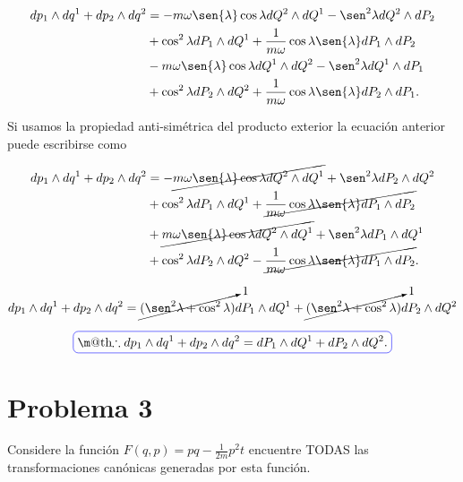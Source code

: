\documentclass[a4paper,10pt]{article}
\makeatletter
\numberwithin{equation}{section}
\newcommand*{\boxcolor}{blue}
\renewcommand{\boxed}[1]{\textcolor{\boxcolor}{%
\tikz[baseline={([yshift=-1ex]current bounding box.center)}] \node [rectangle, minimum width=1ex,rounded corners,draw] {\normalcolor\m@th$\displaystyle#1$};}}
\makeatother
\begin{document}
\begin{align*}
 dp_1 \wedge dq^1 + dp_2 \wedge dq^2 &= - m\omega\sen{\lambda}\cos{\lambda} dQ^2 \wedge dQ^1
  - \sen^2{\lambda}dQ^2 \wedge dP_2 \\ 
  &+ \cos^2{\lambda}dP_1 \wedge dQ^1 + \frac{1}{m\omega}\cos{\lambda}\sen{\lambda} dP_1 \wedge dP_2 \\ 
  &- m\omega\sen{\lambda}\cos{\lambda} dQ^1 \wedge dQ^2
  - \sen^2{\lambda}dQ^1 \wedge dP_1 \\
  &+ \cos^2{\lambda}dP_2 \wedge dQ^2 + \frac{1}{m\omega}\cos{\lambda}\sen{\lambda} dP_2 \wedge dP_1.
\end{align*}

Si usamos la propiedad anti-simétrica del producto exterior la ecuación anterior 
puede escribirse como 

\begin{align*}
 dp_1 \wedge dq^1 + dp_2 \wedge dq^2 &= - \cancel{m\omega\sen{\lambda}\cos{\lambda} dQ^2 \wedge dQ^1}
  + \sen^2{\lambda}dP_2 \wedge dQ^2 \\ 
  &+ \cos^2{\lambda}dP_1 \wedge dQ^1 + \cancel{\frac{1}{m\omega}\cos{\lambda}\sen{\lambda} dP_1 \wedge dP_2} \\ 
  &+ \cancel{m\omega\sen{\lambda}\cos{\lambda} dQ^2 \wedge dQ^1}
  + \sen^2{\lambda}dP_1 \wedge dQ^1 \\
  &+ \cos^2{\lambda}dP_2 \wedge dQ^2 - \cancel{\frac{1}{m\omega}\cos{\lambda}\sen{\lambda} dP_1 \wedge dP_2}.
\end{align*}

\begin{equation}
 dp_1 \wedge dq^1 + dp_2 \wedge dq^2 =  \cancelto{1}{(\sen^2{\lambda} + \cos^2{\lambda})}dP_1 \wedge dQ^1+ 
 \cancelto{1}{(\sen^2{\lambda} + \cos^2{\lambda})}dP_2 \wedge dQ^2 
\end{equation}

\begin{equation}
 \boxed{\therefore dp_1 \wedge dq^1 + dp_2 \wedge dq^2 = dP_1 \wedge dQ^1 + dP_2 \wedge dQ^2.}
\end{equation}

\section{Problema 3}

Considere la función $F(q,p) = pq - \frac{1}{2m}p^2 t$ encuentre TODAS las transformaciones 
canónicas generadas por esta función.

\vspace{.3cm}
\end{document}
